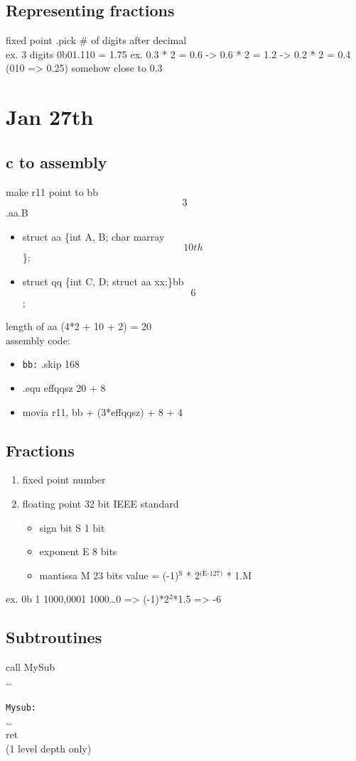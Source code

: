 \documentclass[11pt]{article}
\begin{document}
\subsection{Representing fractions}
\label{sec:orgheadline30}
fixed point .pick \# of digits after decimal \\
ex. 3 digits 0b01.110 = 1.75
ex. 0.3 * 2 = 0.6 -> 0.6 * 2 = 1.2 -> 0.2 * 2 = 0.4 (010 => 0.25) somehow close to 0.3
\section{Jan 27th}
\label{sec:orgheadline36}
\subsection{c to assembly}
\label{sec:orgheadline32}
make r11 point to bb\[3\].aa.B
\begin{itemize}
\item struct aa \{int A, B; char marray\[10th\]\};
\item struct qq \{int C, D; struct aa xx;\}bb\[6\];
\end{itemize}
length of aa (4*2 + 10 + 2) = 20 \\

assembly code:
\begin{itemize}
\item \texttt{bb:} .skip 168
\item .equ effqqsz 20 + 8
\item movia r11, bb + (3*effqqsz) + 8 + 4
\end{itemize}
\subsection{Fractions}
\label{sec:orgheadline33}
\begin{enumerate}
\item fixed point number
\item floating point
32 bit IEEE standard
\begin{itemize}
\item sign bit S 1 bit
\item exponent E 8 bits
\item mantissa M 23 bits
value = (-1)\(^{\text{S}}\) * 2\(^{\text{(E-127)}}\) * 1.M
\end{itemize}
\end{enumerate}
ex. 0b 1 1000,0001 1000\ldots{}0 => (-1)*2\(^{\text{2}}\)*1.5 => -6
\subsection{Subtroutines}
\label{sec:orgheadline35}
call MySub \\
\ldots{} \\
\\
\texttt{Mysub:} \\
\ldots{} \\
ret \\
(1 level depth only)
\end{document}
